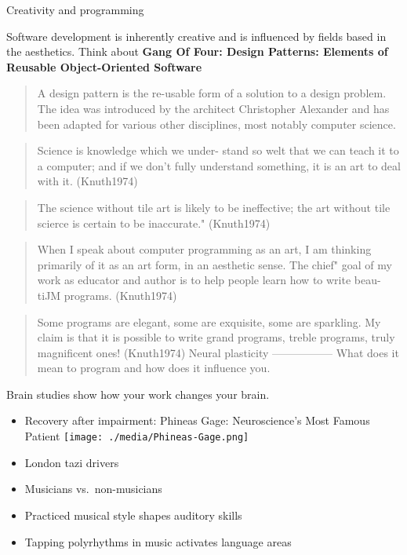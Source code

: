 \begin{frame}{Creativity and programming}

Software development is inherently creative and is influenced by fields
based in the aesthetics. Think about \textbf{Gang Of Four: Design
Patterns: Elements of Reusable Object-Oriented Software}

\begin{quote}
A design pattern is the re-usable form of a solution to a design
problem. The idea was introduced by the architect Christopher Alexander
and has been adapted for various other disciplines, most notably
computer science.
\end{quote}

\begin{quote}
Science is knowledge which we under- stand so welt that we can teach it
to a computer; and if we don't fully understand something, it is an art
to deal with it. (Knuth1974)
\end{quote}

\begin{quote}
The science without tile art is likely to be ineffective; the art
without tile scierce is certain to be inaccurate." (Knuth1974)
\end{quote}

\begin{quote}
When I speak about computer programming as an art, I am thinking
primarily of it as an art form, in an aesthetic sense. The chief" goal
of my work as educator and author is to help people learn how to write
beau- tiJM programs. (Knuth1974)
\end{quote}

\begin{quote}
Some programs are elegant, some are exquisite, some are sparkling. My
claim is that it is possible to write grand programs, treble programs,
truly magnificent ones! (Knuth1974) Neural plasticity -----------------
What does it mean to program and how does it influence you.
\end{quote}

Brain studies show how your work changes your brain.

\begin{itemize}
\item
  Recovery after impairment: Phineas Gage: Neuroscience's Most Famous
  Patient \texttt{[image: ./media/Phineas-Gage.png]}
\item
  London tazi drivers
\item
  Musicians vs.~non-musicians
\item
  Practiced musical style shapes auditory skills
\item
  Tapping polyrhythms in music activates language areas
\end{itemize}


\end{frame}
